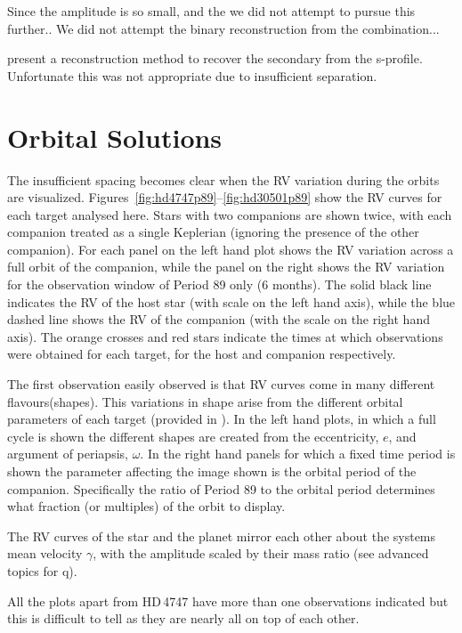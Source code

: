 Since the amplitude is so small, and the we did not attempt to pursue this further..
We did not attempt the binary reconstruction from the combination...

\citet{ferluga_separating_1997} present a reconstruction method to recover the secondary from the s-profile. Unfortunate this was not appropriate due to insufficient separation.


\section{Orbital Solutions}
\label{sec:orbtial_diagrams}
The insufficient spacing becomes clear when the RV variation during the orbits are visualized. Figures~\ref{fig:hd4747p89}--\ref{fig:hd30501p89} show the RV curves for each target analysed here.
Stars with two companions are shown twice, with each companion treated as a single Keplerian (ignoring the presence of the other companion).
For each panel on the left hand plot shows the RV variation across a full orbit of the companion, while the panel on the right shows the RV variation for the observation window of Period 89 only (6 months).
The solid black line indicates the RV of the host star (with scale on the left hand axis), while the blue dashed line shows the RV of the companion (with the scale on the right hand axis).
The orange crosses and red stars indicate the times at which observations were obtained for each target, for the host and companion respectively.

The first observation easily observed is that RV curves come in many different flavours(shapes). This variations in shape arise from the different orbital parameters of each target (provided in ). In the left hand plots, in which a full cycle is shown the different shapes are created from the eccentricity, $e$, and argument of periapsis, $\omega$. In the right hand panels for which a fixed time period is shown the parameter affecting the image shown is the orbital period of the companion. Specifically the ratio of Period 89 to the orbital period determines what fraction (or multiples) of the orbit to display.

The RV curves of the star and the planet mirror each other about the systems mean velocity $\gamma$, with the amplitude scaled by their mass ratio (see \eref{} advanced topics for q). 

All the plots apart from {HD\,4747} have more than one observations indicated but this is difficult to tell as they are nearly all on top of each other.

